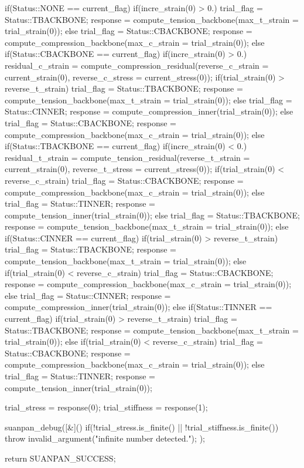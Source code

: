 \begin{cppcode}
{	if(Status::NONE == current_flag) {
		if(incre_strain(0) > 0.) {
			trial_flag = Status::TBACKBONE;
			response = compute_tension_backbone(max_t_strain = trial_strain(0));
		}
		else {
			trial_flag = Status::CBACKBONE;
			response = compute_compression_backbone(max_c_strain = trial_strain(0));
		}
	}
	else if(Status::CBACKBONE == current_flag) {
		if(incre_strain(0) > 0.) {
			residual_c_strain = compute_compression_residual(reverse_c_strain = current_strain(0), reverse_c_stress = current_stress(0));
			if(trial_strain(0) > reverse_t_strain) {
				trial_flag = Status::TBACKBONE;
				response = compute_tension_backbone(max_t_strain = trial_strain(0));
			}
			else {
				trial_flag = Status::CINNER;
				response = compute_compression_inner(trial_strain(0));
			}
		}
		else {
			trial_flag = Status::CBACKBONE;
			response = compute_compression_backbone(max_c_strain = trial_strain(0));
		}
	}
	else if(Status::TBACKBONE == current_flag) {
		if(incre_strain(0) < 0.) {
			residual_t_strain = compute_tension_residual(reverse_t_strain = current_strain(0), reverse_t_stress = current_stress(0));
			if(trial_strain(0) < reverse_c_strain) {
				trial_flag = Status::CBACKBONE;
				response = compute_compression_backbone(max_c_strain = trial_strain(0));
			}
			else {
				trial_flag = Status::TINNER;
				response = compute_tension_inner(trial_strain(0));
			}
		}
		else {
			trial_flag = Status::TBACKBONE;
			response = compute_tension_backbone(max_t_strain = trial_strain(0));
		}
	}
	else if(Status::CINNER == current_flag) {
		if(trial_strain(0) > reverse_t_strain) {
			trial_flag = Status::TBACKBONE;
			response = compute_tension_backbone(max_t_strain = trial_strain(0));
		}
		else if(trial_strain(0) < reverse_c_strain) {
			trial_flag = Status::CBACKBONE;
			response = compute_compression_backbone(max_c_strain = trial_strain(0));
		}
		else {
			trial_flag = Status::CINNER;
			response = compute_compression_inner(trial_strain(0));
		}
	}
	else if(Status::TINNER == current_flag) {
		if(trial_strain(0) > reverse_t_strain) {
			trial_flag = Status::TBACKBONE;
			response = compute_tension_backbone(max_t_strain = trial_strain(0));
		}
		else if(trial_strain(0) < reverse_c_strain) {
			trial_flag = Status::CBACKBONE;
			response = compute_compression_backbone(max_c_strain = trial_strain(0));
		}
		else {
			trial_flag = Status::TINNER;
			response = compute_tension_inner(trial_strain(0));
		}
	}

	trial_stress = response(0);
	trial_stiffness = response(1);

	suanpan_debug([&]() { if(!trial_stress.is_finite() || !trial_stiffness.is_finite()) throw invalid_argument("infinite number detected.\n"); });

	return SUANPAN_SUCCESS;
}
\end{cppcode}
